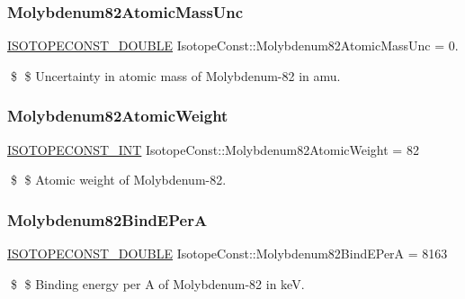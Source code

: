 \subsubsection{\texorpdfstring{Molybdenum82\+Atomic\+Mass\+Unc}{Molybdenum82AtomicMassUnc}}
{\footnotesize\ttfamily \mbox{\hyperlink{group___isotope_const-_macros_ga8f45a7272ce02c0b4c65c44636ed719a}{I\+S\+O\+T\+O\+P\+E\+C\+O\+N\+S\+T\+\_\+\+D\+O\+U\+B\+LE}} Isotope\+Const\+::\+Molybdenum82\+Atomic\+Mass\+Unc = 0.}

\$ \$ Uncertainty in atomic mass of Molybdenum-\/82 in amu. \mbox{\label{group___isotope_const-_molybdenum-_mo82_ga0bcaa908b7c70326ea04f91401ee0ee6}} 
\subsubsection{\texorpdfstring{Molybdenum82\+Atomic\+Weight}{Molybdenum82AtomicWeight}}
{\footnotesize\ttfamily \mbox{\hyperlink{group___isotope_const-_macros_ga5f18360b3e99483a35c32d789e62621c}{I\+S\+O\+T\+O\+P\+E\+C\+O\+N\+S\+T\+\_\+\+I\+NT}} Isotope\+Const\+::\+Molybdenum82\+Atomic\+Weight = 82}

\$ \$ Atomic weight of Molybdenum-\/82. \mbox{\label{group___isotope_const-_molybdenum-_mo82_gaec850c7c70b5ef89c444b4674f6a7293}} 
\subsubsection{\texorpdfstring{Molybdenum82\+Bind\+E\+PerA}{Molybdenum82BindEPerA}}
{\footnotesize\ttfamily \mbox{\hyperlink{group___isotope_const-_macros_ga8f45a7272ce02c0b4c65c44636ed719a}{I\+S\+O\+T\+O\+P\+E\+C\+O\+N\+S\+T\+\_\+\+D\+O\+U\+B\+LE}} Isotope\+Const\+::\+Molybdenum82\+Bind\+E\+PerA = 8163}

\$ \$ Binding energy per A of Molybdenum-\/82 in keV. \mbox{\label{group___isotope_const-_molybdenum-_mo82_gaf8b37f994745b397970ff658874e8ad9}} 
